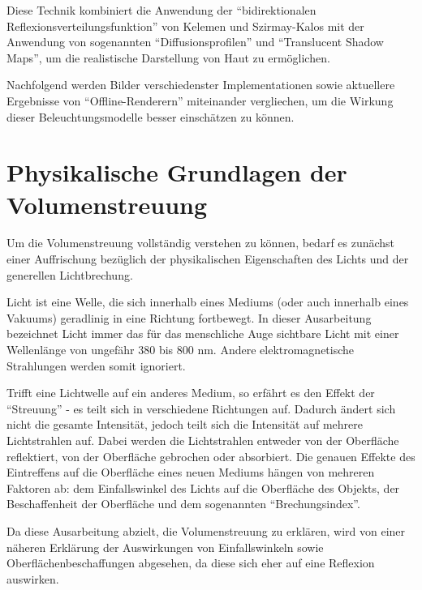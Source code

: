 \documentclass[ngerman,runningheads,a4paper]{llncs}[2018/03/10]
\begin{document}
Diese Technik kombiniert die Anwendung der \enquote{bidirektionalen Reflexions\-verteilungs\-funktion} von Kelemen und Szirmay-Kalos mit der Anwendung von sogenannten \enquote{Diffusionsprofilen} und \enquote{Translucent Shadow Maps}, um die realistische Darstellung von Haut zu ermöglichen.

Nachfolgend werden Bilder verschiedenster Implementationen sowie aktuellere Ergebnisse von \enquote{Offline-Renderern} miteinander vergliechen, um die Wirkung dieser Beleuchtungsmodelle besser einschätzen zu können.

\section{Physikalische Grundlagen der Volumenstreuung}

Um die Volumenstreuung vollständig verstehen zu können, bedarf es zunächst einer Auffrischung bezüglich der physikalischen Eigenschaften des Lichts und der generellen Lichtbrechung.

Licht ist eine Welle, die sich innerhalb eines Mediums (oder auch innerhalb eines Vakuums) geradlinig in eine Richtung fortbewegt.
In dieser Ausarbeitung bezeichnet Licht immer das für das menschliche Auge sichtbare Licht mit einer Wellenlänge von ungefähr 380 bis 800 nm. Andere elektromagnetische Strahlungen werden somit ignoriert.

Trifft eine Lichtwelle auf ein anderes Medium, so erfährt es den Effekt der \enquote{Streuung} - es teilt sich in verschiedene Richtungen auf. Dadurch ändert sich nicht die gesamte Intensität, jedoch teilt sich die Intensität auf mehrere Lichtstrahlen auf.
Dabei werden die Lichtstrahlen entweder von der Oberfläche reflektiert, von der Oberfläche gebrochen oder absorbiert.
Die genauen Effekte des Eintreffens auf die Oberfläche eines neuen Mediums hängen von mehreren Faktoren ab: dem Einfallswinkel des Lichts auf die Oberfläche des Objekts, der Beschaffenheit der Oberfläche und dem sogenannten \enquote{Brechungsindex}.

Da diese Ausarbeitung abzielt, die Volumenstreuung zu erklären, wird von einer näheren Erklärung der Auswirkungen von Einfallswinkeln sowie Oberflächenbeschaffungen abgesehen, da diese sich eher auf eine Reflexion auswirken.
\end{document}
